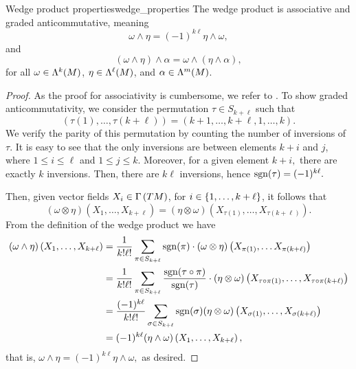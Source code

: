 \begin{proposition}{Wedge product properties}{wedge_properties}
    The wedge product is associative and graded anticommutative, meaning
    \begin{equation*}
        \omega \wedge \eta = (-1)^{k\ell} \eta \wedge \omega,
    \end{equation*}
    and
    \begin{equation*}
        (\omega \wedge \eta) \wedge \alpha = \omega \wedge (\eta \wedge \alpha),
    \end{equation*}
    for all \(\omega \in \forms[k]{M}\), \(\eta \in \forms[\ell]{M}\), and \(\alpha \in \forms[m]{M}\).
\end{proposition}
\begin{proof}
    As the proof for associativity is cumbersome, we refer to \cite{munkres_analysis}. To show graded anticommutativity, we consider the permutation \(\tau \in S_{k+\ell}\) such that
    \begin{equation*}
        (\tau(1), \dots, \tau(k+\ell)) = (k+1, \dots, k+\ell, 1, \dots, k).
    \end{equation*}
    We verify the parity of this permutation by counting the number of inversions of \(\tau.\) It is easy to see that the only inversions are between elements \(k+i\) and \(j\), where \(1 \leq i \leq \ell\) and \(1 \leq j \leq k\). Moreover, for a given element \(k + i,\) there are exactly \(k\) inversions. Then, there are \(k\ell\) inversions, hence  \(\sgn(\tau) = (-1)^{k\ell}.\)

    Then, given vector fields \(X_i \in \sections{TM}\), for \(i \in \set{1, \dots, k+\ell}\), it follows that
    \begin{equation*}
        (\omega \otimes \eta)\left(X_1, \dots, X_{k+\ell}\right) = (\eta \otimes \omega)\left(X_{\tau(1)}, \dots, X_{\tau(k+\ell)}\right).
    \end{equation*}
    From the definition of the wedge product we have
    \begin{align*}
        (\omega \wedge \eta)\left(X_{1}, \dots, X_{k+\ell}\right) &= \frac{1}{k!\ell!} \sum_{\pi \in S_{k+\ell}} \sgn(\pi)\cdot (\omega \otimes \eta)\left(X_{\pi(1)}, \dots X_{\pi(k+\ell)}\right)\\
                                                                  &= \frac{1}{k!\ell!}\sum_{\pi \in S_{k+\ell}} \frac{\sgn(\tau \circ \pi)}{\sgn(\tau)} \cdot (\eta\otimes\omega)\left(X_{\tau\circ\pi(1)}, \dots, X_{\tau\circ\pi(k+\ell)}\right)\\
                                                                  &= \frac{(-1)^{k\ell}}{k!\ell!}\sum_{\sigma \in S_{k+\ell}} \sgn(\sigma) (\eta\otimes\omega)\left(X_{\sigma(1)}, \dots, X_{\sigma(k+\ell)}\right)\\
                                                                  &= (-1)^{k\ell} (\eta \wedge \omega) \left(X_1, \dots, X_{k+\ell}\right),
    \end{align*}
    that is, \(\omega \wedge \eta = (-1)^{k\ell} \eta \wedge \omega,\) as desired.
\end{proof}

